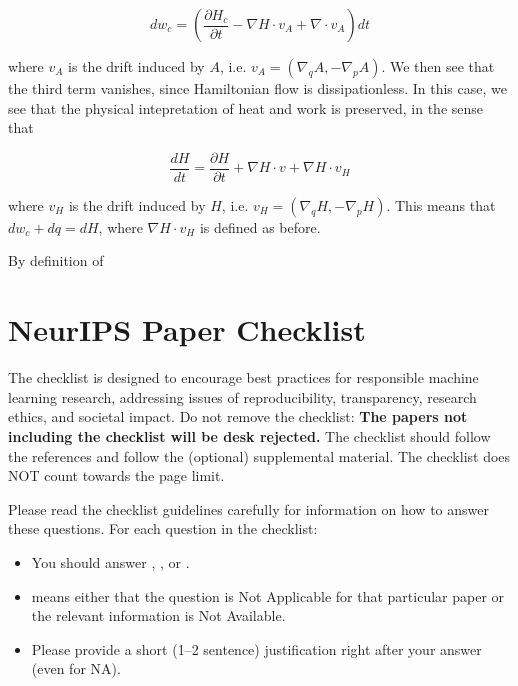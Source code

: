 \documentclass{article}
\begin{document}
$$
dw_c = (\frac{\partial H_c}{\partial t} - \nabla H\cdot v_A + \nabla \cdot v_A)dt
$$

where $v_A$ is the drift induced by $A$, i.e. $v_A = (\nabla_q A, -\nabla_p A)$. We then see that the third term vanishes, since Hamiltonian flow is dissipationless. In this case, we see that the physical intepretation of heat and work is preserved, in the sense that 

$$
\frac{dH}{dt} = \frac{\partial H}{\partial t} + \nabla H \cdot v + \nabla H \cdot v_H
$$

where $v_H$ is the drift induced by $H$, i.e. $v_H = (\nabla_q H, -\nabla_p H)$. This means that $dw_c + dq = dH$, where $\nabla H \cdot v_H$ is defined as before.







By definition of







\newpage
\section*{NeurIPS Paper Checklist}

The checklist is designed to encourage best practices for responsible machine learning research, addressing issues of reproducibility, transparency, research ethics, and societal impact. Do not remove the checklist: {\bf The papers not including the checklist will be desk rejected.} The checklist should follow the references and follow the (optional) supplemental material.  The checklist does NOT count towards the page
limit. 

Please read the checklist guidelines carefully for information on how to answer these questions. For each question in the checklist:
\begin{itemize}
    \item You should answer \answerYes{}, \answerNo{}, or \answerNA{}.
    \item \answerNA{} means either that the question is Not Applicable for that particular paper or the relevant information is Not Available.
    \item Please provide a short (1–2 sentence) justification right after your answer (even for NA). 
\end{itemize}
\end{document}
